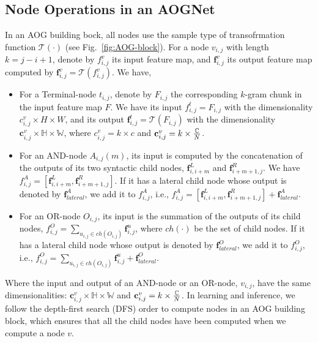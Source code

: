 \documentclass[10pt,twocolumn,letterpaper]{article}
\begin{document}
\subsection{Node Operations in an AOGNet}
In an AOG building bock, all nodes use the sample type of transofrmation function $\mathcal{T}(\cdot)$ (see Fig.~\ref{fig:AOG-block}). For a node $v_{i,j}$ with length $k=j-i+1$, denote by $f^v_{i,j}$ its input feature map,  and $\mathbf{f}^v_{i,j}$ its output feature map computed by $\mathbf{f}^v_{i,j}=\mathcal{T}(f^v_{i,j})$. We have, 
\begin{itemize}[leftmargin=*]
\itemsep0em
    \item For a Terminal-node $t_{i,j}$, denote by $F_{i,j}$ the corresponding $k$-gram chunk in the input feature map $F$. We have its input $f^t_{i,j}=F_{i,j}$ with the dimensionality $c^v_{i,j}\times H \times W$, and its output $\mathbf{f}^t_{i,j}=\mathcal{T}(F_{i,j})$ with the dimensionality $\mathbf{c}^v_{i,j}\times \mathbb{H} \times \mathbb{W}$, where $c^v_{i,j}=k\times c$ and $\mathbf{c}^v_{i,j}=k\times {\mathbb{C}\over N}$.  
    \item For an AND-node $A_{i,j}(m)$, its input is computed by the concatenation of the outputs of its two syntactic child nodes, $\mathbf{f}^L_{i,i+m}$ and $\mathbf{f}^R_{i+m+1, j}$. We have $f^A_{i,j}=[\mathbf{f}^L_{i,i+m}, \mathbf{f}^R_{i+m+1, j}]$. If it has a lateral child node whose output is denoted by $\mathbf{f}^A_{lateral}$, we add it to $f^A_{i,j}$, i.e.,  $f^A_{i,j}=[\mathbf{f}^L_{i,i+m}, \mathbf{f}^R_{i+m+1, j}]+\mathbf{f}^A_{lateral}$.   
    \item For an OR-node $O_{i,j}$, its input  is the summation of the outputs of its child nodes, $f^O_{i,j}=\sum_{u_{i,j}\in ch(O_{i,j})} \mathbf{f}^u_{i,j}$, where $ch(\cdot)$ be the set of child nodes. If it has a lateral child node whose output is denoted by $\mathbf{f}^O_{lateral}$, we add it to $f^O_{i,j}$, i.e.,  $f^O_{i,j}=\sum_{u_{i,j}\in ch(O_{i,j})} \mathbf{f}^u_{i,j}+\mathbf{f}^O_{lateral}$. 
\end{itemize}
Where the input and output of an AND-node or an OR-node, $v_{i,j}$, have the same dimensionalities: $\mathbf{c}^v_{i,j} \times \mathbb{H}\times \mathbb{W}$ and $\mathbf{c}^v_{i,j}=k\times {\mathbb{C}\over N}$.  
In learning and inference, we follow the depth-first search (DFS) order to compute nodes in an AOG building block, which ensures that all the child nodes have been computed when we compute a node $v$.   

\end{document}
